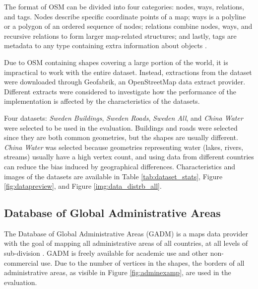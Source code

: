 

The format of OSM can be divided into four categories: nodes, ways, relations, and tags. Nodes describe specific coordinate points of a map; ways is a polyline or a polygon of an ordered sequence of nodes; relations combine nodes, ways, and recursive relations to form larger map-related structures; and lastly, tags are metadata to any type containing extra information about objects \cite{osm_datastructure}.

Due to OSM containing shapes covering a large portion of the world, it is impractical to work with the entire dataset. Instead, extractions from the dataset were downloaded through Geofabrik, an OpenStreetMap data extract provider. Different extracts were considered to investigate how the performance of the implementation is affected by the characteristics of the datasets.

Four datasets: \emph{Sweden Buildings}, \emph{Sweden Roads}, \emph{Sweden All}, and \emph{China Water} were selected to be used in the evaluation. Buildings and roads were selected since they are both common geometries, but the shapes are usually different. \emph{China Water} was selected because geometries representing water (lakes, rivers, streams) usually have a high vertex count, and using data from different countries can reduce the bias induced by geographical differences. Characteristics and images of the datasets are available in Table \ref{tab:dataset_stats}, Figure \ref{fig:datapreview}, and Figure \ref{img:data_distrb_all}.

\subsection{Database of Global Administrative Areas}
The Database of Global Administrative Areas (GADM) is a maps data provider with the goal of mapping all administrative areas of all countries, at all levels of sub-division \cite{gadm}. GADM is freely available for academic use and other non-commercial use. Due to the number of vertices in the shapes, the borders of all administrative areas, as visible in Figure \ref{fig:adminexamp}, are used in the evaluation.


